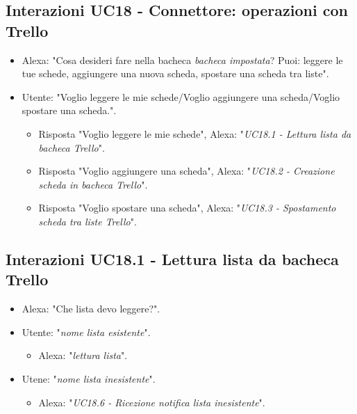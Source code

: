 \subsection{Interazioni  UC18 - Connettore: operazioni con Trello}
\label{sec:connettore_trello} 
 \begin{itemize}
        \item Alexa: "Cosa desideri fare nella bacheca {\it bacheca impostata}? Puoi: leggere le tue schede, aggiungere una nuova scheda, spostare una scheda tra liste".
        \item Utente: "Voglio leggere le mie schede/Voglio aggiungere una scheda/Voglio spostare una scheda.".
        \begin{itemize}
         \item{Risposta "Voglio leggere le mie schede"}, Alexa: "{\it UC18.1 - Lettura lista da bacheca Trello}".
         \item{Risposta "Voglio aggiungere una scheda"}, Alexa: "{\it  UC18.2 - Creazione scheda in bacheca Trello}".
         \item{Risposta "Voglio spostare una scheda"}, Alexa: "{\it UC18.3 - Spostamento scheda tra liste Trello}".
         \end{itemize}
    \end{itemize}


\subsection{Interazioni UC18.1 - Lettura lista da bacheca Trello}
\label{sec:connettore_trello_leggi_bacheca}
 \begin{itemize}
        \item Alexa: "Che lista devo leggere?".
        \item Utente: "{\it nome lista esistente}".
        \begin{itemize}
        \item Alexa: "{\it lettura lista}".
           \end{itemize}
        \item Utene: "{\it nome lista inesistente}".
           \begin{itemize}
        \item Alexa: "{\it UC18.6 - Ricezione notifica lista inesistente}".
           \end{itemize}
    \end{itemize}


